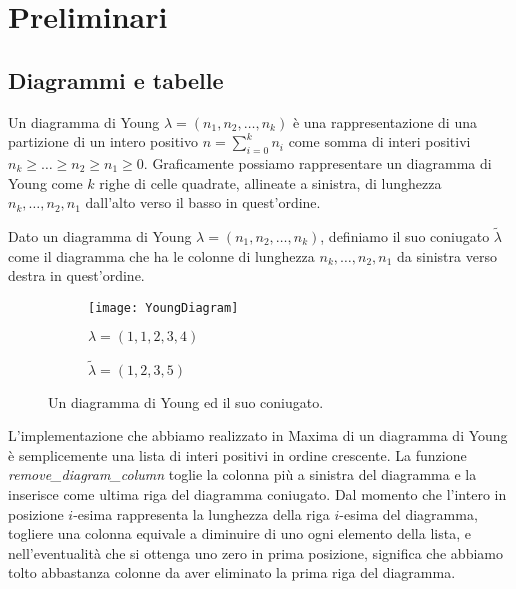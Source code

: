 \chapter{Preliminari}

\section{Diagrammi e tabelle}

\begin{defn}
Un diagramma di Young $\lambda=(n_1,n_2,\dots,n_k)$ \`e una
rappresentazione di una partizione di un intero positivo $n =
\sum_{i=0}^{k}{n_i}$ come somma di interi positivi $n_k \geq \ldots \geq
n_2 \geq n_1 \geq 0$. Graficamente possiamo rappresentare un diagramma di
Young come $k$ righe di celle quadrate, allineate a sinistra, di
lunghezza $n_k,\ldots,n_2,n_1$ dall'alto verso il basso in quest'ordine.
\end{defn}

\begin{defn}
Dato un diagramma di Young $\lambda=(n_1,n_2,\dots,n_k)$, definiamo il
suo coniugato $\tilde{\lambda}$ come il diagramma che ha le colonne di
lunghezza $n_k,\ldots,n_2,n_1$ da sinistra verso destra in quest'ordine.  
\end{defn}

\begin{figure}[h]
\centering

\begin{subfigure}[b]{0.4\textwidth}
\centering
\texttt{[image: YoungDiagram]}
\caption{$\lambda=(1,1,2,3,4)$}
\end{subfigure}%
\begin{subfigure}[b]{0.4\textwidth}
\centering
{}
\caption{$\tilde{\lambda}=(1,2,3,5)$}
\end{subfigure}
\caption{Un diagramma di Young ed il suo coniugato.}
\end{figure}

L'implementazione che abbiamo realizzato in Maxima di un diagramma di Young \`e
semplicemente una lista di interi positivi in ordine crescente.
La funzione \emph{remove\_diagram\_column} toglie la colonna pi\`u a
sinistra del diagramma e la inserisce come ultima riga del diagramma
coniugato. 
Dal momento che l'intero in posizione $i$-esima rappresenta
la lunghezza della riga $i$-esima del diagramma, togliere una colonna
equivale a diminuire di uno ogni elemento della lista, e
nell'eventualit\`a che si ottenga uno zero in prima posizione,
significa che abbiamo tolto abbastanza colonne da aver eliminato la
prima riga del diagramma.

